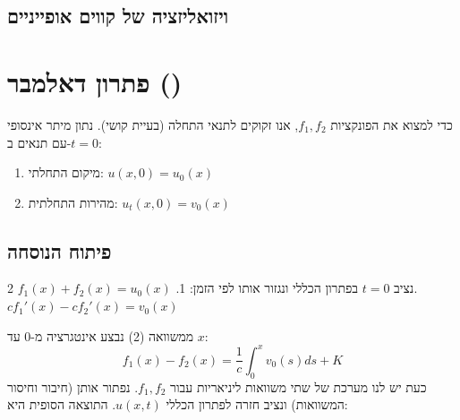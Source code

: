 \subsection{ויזואליזציה של קווים אופייניים}
\begin{center}
\end{center}

\section{פתרון דאלמבר ()}

כדי למצוא את הפונקציות $f_1, f_2$, אנו זקוקים לתנאי התחלה (בעיית קושי). נתון מיתר אינסופי עם תנאים ב-$t=0$:
\begin{enumerate}
    \item מיקום התחלתי: $u(x,0) = u_0(x)$
    \item מהירות התחלתית: $u_t(x,0) = v_0(x)$
\end{enumerate}

\subsection{פיתוח הנוסחה}
נציב $t=0$ בפתרון הכללי ונגזור אותו לפי הזמן:
1. $f_1(x) + f_2(x) = u_0(x)$
2. $c f_1'(x) - c f_2'(x) = v_0(x)$

ממשוואה (2) נבצע אינטגרציה מ-$0$ עד $x$:
$$ f_1(x) - f_2(x) = \frac{1}{c} \int_0^x v_0(s) ds + K $$
כעת יש לנו מערכת של שתי משוואות ליניאריות עבור $f_1, f_2$. נפתור אותן (חיבור וחיסור המשוואות) ונציב חזרה לפתרון הכללי $u(x,t)$. התוצאה הסופית היא:

